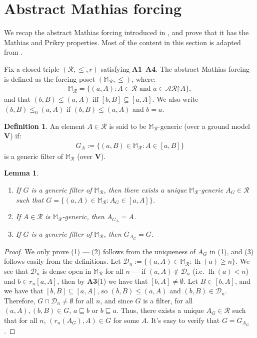 \documentclass[11pt,reqno]{amsart}
\theoremstyle{plain}
\numberwithin{equation}{section}
\newtheorem{lemma}[theorem]{Lemma}
\theoremstyle{definition}
\newtheorem{definition}[theorem]{Definition}
\newcommand{\func}{\operatorname}
\newcommand{\cal}{\mathcal}
\renewcommand{\bf}{\mathbf}
\newcommand{\restrictedto}{\mathord{\upharpoonright}}
\newcommand{\V}{\bf{V}}
\newcommand{\lh}{\func{lh}}
\newcommand{\D}{\cal{D}}
\DeclareRobustCommand{\S}{\ifmmode\mathcal{S}\else\Sec\fi}
\begin{document}
\section{Abstract Mathias forcing}
\label{sec:abstract.Mathias.forcing}
We recap the abstract Mathias forcing introduced in \cite{DMN15}, and prove that it has the Mathias and Prikry properties. Most of the content in this section is adapted from \cite[\S6]{Y25}.

Fix a closed triple $(\cal{R},\leq,r)$ satisfying \textbf{A1}--\textbf{A4}. The abstract Mathias forcing is defined as the forcing poset $(\mathbb{M}_\cal{R},\leq)$, where:
\begin{align*}
    \mathbb{M}_\cal{R} = \{(a,A) : A \in \cal{R} \text{ and } a \in \cal{AR}\restrictedto A\},
\end{align*}
and that $(b,B) \leq (a,A)$ iff $[b,B] \subseteq [a,A]$. We also write $(b,B) \leq_0 (a,A)$ if $(b,B) \leq (a,A)$ and $b = a$.

\begin{definition}
    An element $A \in \cal{R}$ is said to be $\mathbb{M}_\cal{R}$-generic (over a ground model $\V$) if:
    \begin{align*}
        G_A := \{(a,B) \in \mathbb{M}_\cal{R} : A \in [a,B]\}
    \end{align*}
    is a generic filter of $\mathbb{M}_\cal{R}$ (over $\V$).
\end{definition}

\begin{lemma}
\label{lem:generic.filter.and.element}
\hfill
    \begin{enumerate}
        \item If $G$ is a generic filter of $\mathbb{M}_\cal{R}$, then there exists a unique $\mathbb{M}_\cal{R}$-generic $A_G \in \cal{R}$ such that $G = \{(a,A) \in \mathbb{M}_\cal{R} : A_G \in [a,A]\}$.

        \item If $A \in \cal{R}$ is $\mathbb{M}_\cal{R}$-generic, then $A_{G_A} = A$.

        \item If $G$ is a generic filter of $\mathbb{M}_\cal{R}$, then $G_{A_G} = G$.
    \end{enumerate}
\end{lemma}

\begin{proof}
    We only prove (1) --- (2) follows from the uniqueness of $A_G$ in (1), and (3) follows easily from the definitions. Let $\D_n := \{(a,A) \in \mathbb{M}_\cal{R} : \lh(a) \geq n\}$. We see that $\D_n$ is dense open in $\mathbb{M}_\cal{R}$ for all $n$ --- if $(a,A) \notin \D_n$ (i.e. $\lh(a) < n$) and $b \in r_n[a,A]$, then by \textbf{A3}(1) we have that $[b,A] \neq \emptyset$. Let $B \in [b,A]$, and we have that $[b,B] \subseteq [a,A]$, so $(b,B) \leq (a,A)$ and $(b,B) \in \D_n$. Therefore, $G \cap \D_n \neq \emptyset$ for all $n$, and since $G$ is a filter, for all $(a,A),(b,B) \in G$, $a \sqsubseteq b$ or $b \sqsubseteq a$. Thus, there exists a unique $A_G \in \cal{R}$ such that for all $n$, $(r_n(A_G),A) \in G$ for some $A$. It's easy to verify that $G = G_{A_G}$.
\end{proof} 
\end{document}
